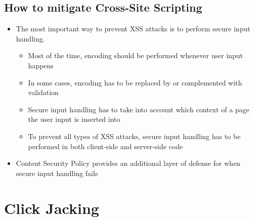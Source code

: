 \documentclass[a4paper, titlepage]{article}
\begin{document}
\subsection{How to mitigate Cross-Site Scripting}
\begin{itemize}
    \item The most important way to prevent XSS attacks is to perform secure input handling.
    \begin{itemize}
        \item Most of the time, encoding should be performed whenever user input happens
        \item In some cases, encoding has to be replaced by or complemented with validation
        \item Secure input handling has to take into account which context of a page the user input is inserted into
        \item To prevent all types of XSS attacks, secure input handling has to be performed in both client-side and server-side code
    \end{itemize}
\item Content Security Policy provides an additional layer of defense for when secure input handling fails
\end{itemize}
\newpage

\section{Click Jacking}
\newpage
\end{document}

